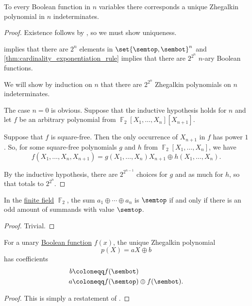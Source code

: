 \begin{proposition}\label{thm:zhegalkin_polynomial_uniqueness}
  To every Boolean function in \( n \) variables there corresponds a unique Zhegalkin polynomial in \( n \) indeterminates.
\end{proposition}
\begin{proof}
  Existence follows by , so we must show uniqueness.

   implies that there are \( 2^n \) elements in \( \set{ \semtop, \sembot }^n \) and \cref{thm:cardinality_exponentiation_rule} implies that there are \( 2^{2^n} \) \( n \)-ary Boolean functions.

  We will show by induction on \( n \) that there are \( 2^{2^n} \) Zhegalkin polynomials on \( n \) indeterminates.

  The case \( n = 0 \) is obvious. Suppose that the inductive hypothesis holds for \( n \) and let \( f \) be an arbitrary polynomial from \( \BbbF_2[X_1, \ldots, X_n][X_{n+1}] \).

  Suppose that \( f \) is square-free. Then the only occurrence of \( X_{n+1} \) in \( f \) has power \( 1 \). So, for some square-free polynomials \( g \) and \( h \) from \( \BbbF_2[X_1, \ldots, X_n] \), we have
  \begin{equation*}
    f(X_1, \ldots, X_n, X_{n+1}) = g(X_1, \ldots, X_n) X_{n+1} \oplus h(X_1, \ldots, X_n).
  \end{equation*}

  By the inductive hypothesis, there are \( 2^{2^{n-1}} \) choices for \( g \) and as much for \( h \), so that totals to \( 2^{2^n} \).
\end{proof}

\begin{lemma}\label{thm:f2_sum_parity}
  In the \hyperref[def:finite_field]{finite field} \( \BbbF_2 \), the sum \( a_1 \oplus \cdots \oplus a_n \) is \( \semtop \) if and only if there is an odd amount of summands with value \( \semtop \).
\end{lemma}
\begin{proof}
  Trivial.
\end{proof}

\begin{proposition}\label{thm:unary_boolean_function_zhegalkin_polynomial}
  For a unary \hyperref[def:boolean_function]{Boolean function} \( f(x) \), the unique Zhegalkin polynomial
  \begin{equation}\label{eq:thm:unary_boolean_function_zhegalkin_polynomial}
    p(X) = aX \oplus b
  \end{equation}
  has coefficients
  \begin{align*}
    b &\coloneqq f(\sembot) \\
    a &\coloneqq f(\semtop) \oplus f(\sembot).
  \end{align*}
\end{proposition}
\begin{proof}
  This is simply a restatement of .
\end{proof}

